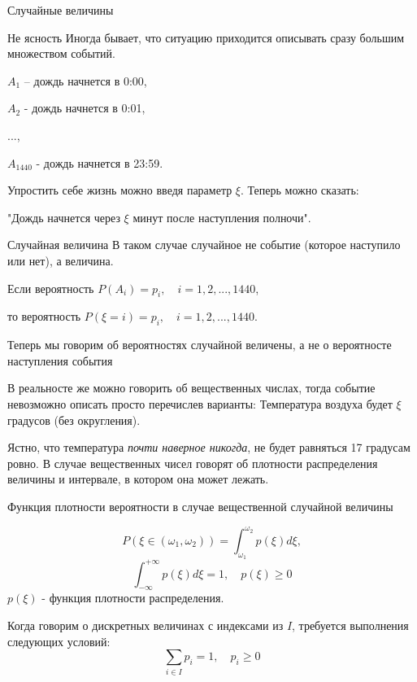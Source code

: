 \documentclass[]{beamer}
\begin{document}
\begin{frame}{Случайные величины}
	\begin{block}{Не ясность}
		Иногда бывает, что ситуацию приходится описывать сразу большим множеством событий. 

		$A_1$ -- дождь начнется в 0:00,

		$A_2$ - дождь начнется в 0:01,

		...,

		$A_{1440}$ - дождь начнется в 23:59.
		
		
		Упростить себе жизнь можно введя параметр $\xi$. Теперь можно сказать:

		"Дождь начнется через $\xi$ минут после наступления полночи".

	\end{block}
	\begin{block}{Случайная величина}
		В таком случае случайное не событие (которое наступило или нет), а величина.
	\end{block}
\end{frame}
\begin{frame}{}
	\begin{block}{}
		Если вероятность $P(A_i) = p_i, \quad i = 1, 2,..., 1440$, 

		то вероятность $P(\xi = i) = p_i, \quad i = 1, 2,..., 1440.$

		
		Теперь мы говорим об вероятностях случайной величены, а не о вероятносте наступления события
	\end{block}

	\begin{block}{}
		В реальносте же можно говорить об вещественных числах, тогда событие невозможно описать 
		просто перечислев варианты: Температура воздуха будет $\xi$ градусов (без округления).
	\end{block}

	\begin{block}{}
		 Ястно, что температура \textit{почти наверное никогда}, не будет равняться 17 градусам ровно.
		 В случае вещественных чисел говорят об плотности распределения величины и интервале, в котором она может лежать. 
	\end{block}
\end{frame}

\begin{frame}{Функция плотности вероятности в случае вещественной случайной величины}	
	\begin{block}{}
	\begin{equation}
		P(\xi \in (\omega_1, \omega_2)) = \int_{\omega_1}^{\omega_2} p(\xi) d \xi ,
	\end{equation}
	\begin{equation}
		\int_{-\infty}^{+\infty} p(\xi) d\xi = 1, \quad  p(\xi) \geq 0
	\end{equation}
	$p(\xi)$ - функция плотности распределения.
	\end{block}
        Когда говорим о дискретных величинах с индексами из $I$, требуется выполнения следующих условий:
	$$\sum_{i \in I} p_i = 1, \quad p_i \geq 0 $$
\end{frame}
\end{document}

